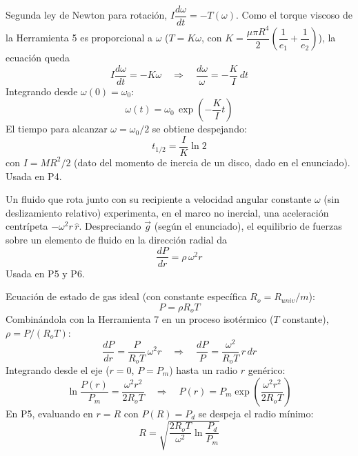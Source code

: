\documentclass[12pt]{article}
\begin{document}

Segunda ley de Newton para rotaci\'on, $I\dfrac{d\omega}{dt}=-T(\omega)$. Como el
torque viscoso de la Herramienta 5 es proporcional a $\omega$ ($T=K\omega$, con
$K=\dfrac{\mu\pi R^4}{2}\left(\dfrac1{e_1}+\dfrac1{e_2}\right)$), la ecuaci\'on queda
\[
I\frac{d\omega}{dt}=-K\omega
\quad\Longrightarrow\quad
\frac{d\omega}{\omega}=-\frac{K}{I}\,dt
\]
Integrando desde $\omega(0)=\omega_0$:
\[
\boxed{\omega(t)=\omega_0\,\exp\!\left(-\frac{K}{I}t\right)}
\]
El tiempo para alcanzar $\omega=\omega_0/2$ se obtiene despejando:
\[
\boxed{t_{1/2}=\frac{I}{K}\ln 2}
\]
con $I=MR^2/2$ (dato del momento de inercia de un disco, dado en el enunciado). Usada
en P4.


Un fluido que rota junto con su recipiente a velocidad angular constante $\omega$
(sin deslizamiento relativo) experimenta, en el marco no inercial, una aceleraci\'on
centr\'ipeta $-\omega^2 r\,\hat r$. Despreciando $\vec g$ (seg\'un el enunciado), el
equilibrio de fuerzas sobre un elemento de fluido en la direcci\'on radial da
\[
\boxed{\frac{dP}{dr}=\rho\,\omega^2 r}
\]
Usada en P5 y P6.


Ecuaci\'on de estado de gas ideal (con constante espec\'ifica $R_o=R_{univ}/m$):
\[
\boxed{P=\rho R_o T}
\]
Combin\'andola con la Herramienta 7 en un proceso isot\'ermico ($T$ constante),
$\rho=P/(R_oT)$:
\[
\frac{dP}{dr}=\frac{P}{R_oT}\,\omega^2 r
\quad\Longrightarrow\quad
\frac{dP}{P}=\frac{\omega^2}{R_oT}\,r\,dr
\]
Integrando desde el eje ($r=0$, $P=P_m$) hasta un radio $r$ gen\'erico:
\[
\ln\frac{P(r)}{P_m}=\frac{\omega^2 r^2}{2R_oT}
\quad\Longrightarrow\quad
\boxed{P(r)=P_m\exp\!\left(\frac{\omega^2 r^2}{2R_oT}\right)}
\]
En P5, evaluando en $r=R$ con $P(R)=P_d$ se despeja el radio m\'inimo:
\[
\boxed{R=\sqrt{\frac{2R_oT}{\omega^2}\ln\frac{P_d}{P_m}}}
\]

\end{document}
